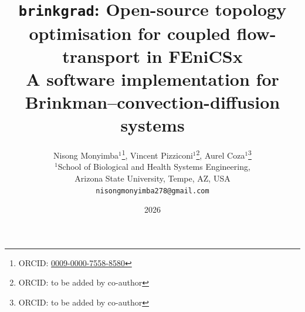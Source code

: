\documentclass[12pt,a4paper]{article}
\title{\texttt{brinkgrad}: Open-source topology optimisation for coupled flow-transport in FEniCSx\\
\large A software implementation for Brinkman--convection-diffusion systems}
\author{Nisong Monyimba$^{1}$\thanks{ORCID:
  \href{https://orcid.org/0009-0000-7558-8580}{0009-0000-7558-8580}},
  Vincent Pizziconi$^{1}$\thanks{ORCID: to be added by co-author},
  Aurel Coza$^{1}$\thanks{ORCID: to be added by co-author}\\
\small $^{1}$School of Biological and Health Systems Engineering,\\
\small Arizona State University, Tempe, AZ, USA\\
\small \texttt{nisongmonyimba278@gmail.com}}
\date{2026}
\begin{document}
\sloppy
\maketitle

\begin{abstract}

\end{abstract}









\appendix





\end{document}
